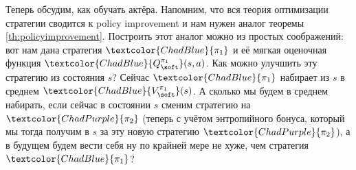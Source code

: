 Теперь обсудим, как обучать актёра. Напомним, что вся теория оптимизации стратегии сводится к policy improvement и нам нужен аналог теоремы \ref{th:policyimprovement}. Построить этот аналог можно из простых соображений: вот нам дана стратегия $\textcolor{ChadBlue}{\pi_1}$ и её мягкая оценочная функция $\textcolor{ChadBlue}{Q^{\pi_1}_{\soft}}(s, a)$. Как можно улучшить эту стратегию из состояния $s$? Сейчас $\textcolor{ChadBlue}{\pi_1}$ набирает из $s$ в среднем $\textcolor{ChadBlue}{V^{\pi_1}_{\soft}}(s)$. А сколько мы будем в среднем набирать, если сейчас в состоянии $s$ сменим стратегию на $\textcolor{ChadPurple}{\pi_2}$ (теперь с учётом энтропийного бонуса, который мы тогда получим в $s$ за эту новую стратегию $\textcolor{ChadPurple}{\pi_2}$), а в будущем будем вести себя ну по крайней мере не хуже, чем стратегия $\textcolor{ChadBlue}{\pi_1}$?

